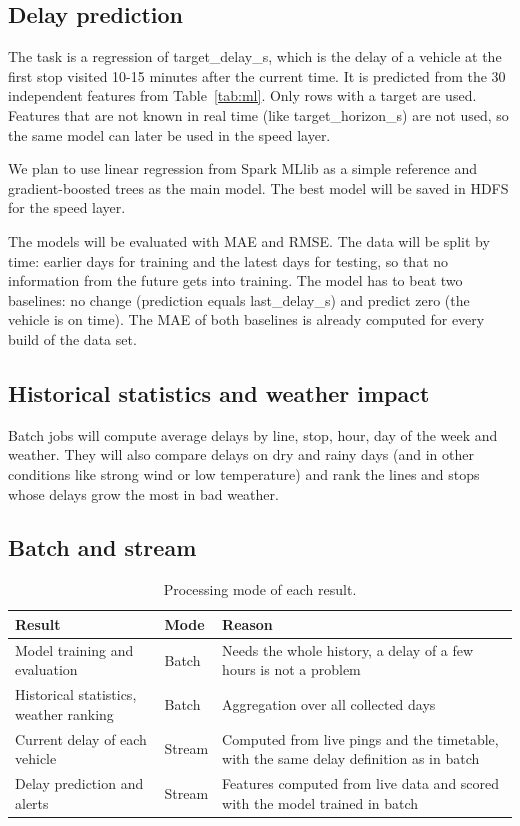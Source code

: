 \documentclass[11pt]{article}
\begin{document}
\subsection{Delay prediction}

The task is a regression of target\_delay\_s, which is the delay of a vehicle at the first stop visited 10-15 minutes after
the current time. It is predicted from the 30 independent features from Table~\ref{tab:ml}. Only rows with a target are used.
Features that are not known in real time (like target\_horizon\_s) are not used, so the same model can later be used in the
speed layer.

We plan to use linear regression from Spark MLlib as a simple reference and gradient-boosted trees as the main model.
The best model will be saved in HDFS for the speed layer.

The models will be evaluated with MAE and RMSE. The data will be split by time: earlier days for training and the latest days
for testing, so that no information from the future gets into training. The model has to beat two baselines: no change
(prediction equals last\_delay\_s) and predict zero (the vehicle is on time). The MAE of both baselines is already computed
for every build of the data set.

\subsection{Historical statistics and weather impact}

Batch jobs will compute average delays by line, stop, hour, day of the week and weather. They will also compare delays on dry
and rainy days (and in other conditions like strong wind or low temperature) and rank the lines and stops whose delays grow the
most in bad weather.

\subsection{Batch and stream}

\begin{table}[H]
\centering
\small
\caption{Processing mode of each result.}\label{tab:mode}
\begin{tabular}{|>{\raggedright\arraybackslash}p{4cm}|>{\raggedright\arraybackslash}p{1.8cm}|>{\raggedright\arraybackslash}p{7.6cm}|}
\hline
\textbf{Result} & \textbf{Mode} & \textbf{Reason} \\
\hline
Model training and evaluation & Batch & Needs the whole history, a delay of a few hours is not a problem \\
\hline
Historical statistics, weather ranking & Batch & Aggregation over all collected days \\
\hline
Current delay of each vehicle & Stream & Computed from live pings and the timetable, with the same delay definition as in batch \\
\hline
Delay prediction and alerts & Stream & Features computed from live data and scored with the model trained in batch \\
\hline
\end{tabular}
\end{table}
\end{document}

